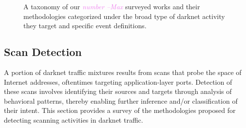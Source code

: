 \documentclass[manuscript,nonacm]{acmart}
\newcommand{\maxnote}[1]{\textit{\textcolor{violet}{#1 --Max}}}
\begin{document}

\begin{figure}
    \caption{A taxonomy of our \maxnote{number} surveyed works and their methodologies categorized under the broad type of darknet activity they target and specific event definitions.}
    \label{fig:taxonomy}
\end{figure}

\subsection{Scan Detection}

A portion of darknet traffic mixtures results from scans that probe the space of Internet addresses, oftentimes targeting application-layer ports.
Detection of these scans involves identifying their sources and targets through analysis of behavioral patterns, thereby enabling further inference and/or classification of their intent.
This section provides a survey of the methodologies proposed for detecting scanning activities in darknet traffic. 

\end{document}

